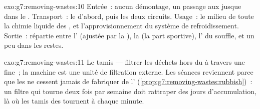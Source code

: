 \begin{solution}{exo:g7:removing-wastes:10}
Entrée~: aucun démontage, un passage aux  jusque dans le
. Transport~: le  d'abord, puis les deux circuits. Usage~:
le milieu de toute la chimie liquide des , et
l'approvisionnement du système de refroidissement. Sortie~:
répartie entre l' (ajustée par la ), la  (la
part sportive), l' du souffle, et un peu dans les restes.
\end{solution}

\begin{solution}{exo:g7:removing-wastes:11}
Le tamis --- filtrer les déchets hors du  à travers une 
fine~; la machine est une unité de filtration externe. Les séances
reviennent parce que les  ne cessent jamais de fabriquer de
l' (\cref{prop:g7:removing-wastes:rubbish})~: un filtre qui
tourne deux fois par semaine doit rattraper des jours
d'accumulation, là où les tamis des  tournent à chaque minute.
\end{solution}

